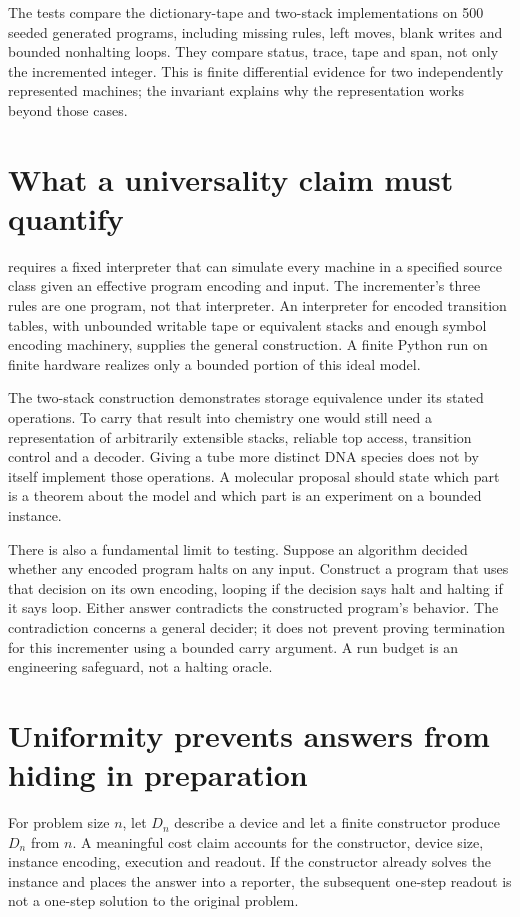 The tests compare the dictionary-tape and two-stack implementations on 500
seeded generated programs, including missing rules, left moves, blank writes
and bounded nonhalting loops. They compare status, trace, tape and span,
not only the incremented integer. This is finite differential evidence for
two independently represented machines; the invariant explains why the
representation works beyond those cases.

\section{What a universality claim must quantify}
 requires a fixed interpreter that can simulate every
machine in a specified source class given an effective program encoding and
input. The incrementer's three rules are one program, not that interpreter.
An interpreter for encoded transition tables, with unbounded writable tape
or equivalent stacks and enough symbol encoding machinery, supplies the
general construction. A finite Python run on finite hardware realizes only
a bounded portion of this ideal model.

The two-stack construction demonstrates storage equivalence under its stated
operations. To carry that result into chemistry one would still need a
representation of arbitrarily extensible stacks, reliable top access,
transition control and a decoder. Giving a tube more distinct DNA species
does not by itself implement those operations. A molecular proposal should
state which part is a theorem about the model and which part is an
experiment on a bounded instance.

There is also a fundamental limit to testing. Suppose an algorithm decided
whether any encoded program halts on any input. Construct a program that
uses that decision on its own encoding, looping if the decision says halt
and halting if it says loop. Either answer contradicts the constructed
program's behavior. The contradiction concerns a general decider; it does
not prevent proving termination for this incrementer using a bounded carry
argument. A run budget is an engineering safeguard, not a halting oracle.

\section{Uniformity prevents answers from hiding in preparation}
For problem size $n$, let $D_n$ describe a device and let a finite constructor
produce $D_n$ from $n$. A meaningful cost claim accounts for the constructor,
device size, instance encoding, execution and readout. If the constructor
already solves the instance and places the answer into a reporter, the
subsequent one-step readout is not a one-step solution to the original problem.

